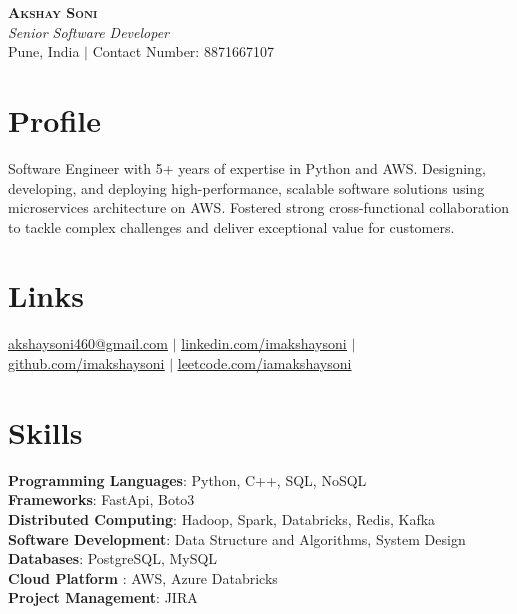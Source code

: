 \documentclass[letterpaper,11pt]{article}
\begin{document}

\begin{center}
    \textbf{\Huge \scshape  Akshay Soni} \\ \vspace{1pt}
    \small \textit{Senior Software Developer } \\
    Pune, India $|$ {Contact Number: 8871667107}
\end{center}

\section*{Profile}
Software Engineer with 5+ years of expertise in Python and AWS. Designing, developing, and deploying high-performance, scalable software solutions using microservices architecture on AWS. Fostered strong cross-functional collaboration to tackle complex challenges and deliver exceptional value for customers. 

\section{Links}
 \small { \href{mailto:akshaysoni460@gmail.com}{\underline{akshaysoni460@gmail.com}} $|$
  \href{https://www.linkedin.com/in/imakshaysoni}{\underline{linkedin.com/imakshaysoni}} $|$
    \href{https://github.com/imakshaysoni}{\underline{github.com/imakshaysoni}} $|$
     \href{https://leetcode.com/iamakshaysoni}{\underline{leetcode.com/iamakshaysoni}} 
    }

\section{Skills}
 \begin{itemize}[leftmargin=0.15in, label={}]
    \small{\item{
     \textbf{Programming Languages}{: Python, C++, SQL, NoSQL} \\
     \textbf{Frameworks}{: FastApi, Boto3} \\   
\textbf{Distributed Computing}{: Hadoop, Spark, Databricks, Redis, Kafka} \\
     \textbf{Software Development}{: Data Structure and Algorithms, System Design} \\  \textbf{Databases}{: PostgreSQL, MySQL} \\\textbf{Cloud Platform }{: AWS, Azure Databricks}\\
     \textbf{Project Management}{: JIRA}
    }}
 \end{itemize}
\end{document}
